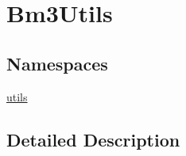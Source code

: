 \hypertarget{group___bm3_utils}{}\section{Bm3\+Utils}
\label{group___bm3_utils}
\subsection*{Namespaces}
\begin{DoxyCompactItemize}
\item 
 \mbox{\hyperlink{namespaceutils}{utils}}
\end{DoxyCompactItemize}


\subsection{Detailed Description}
